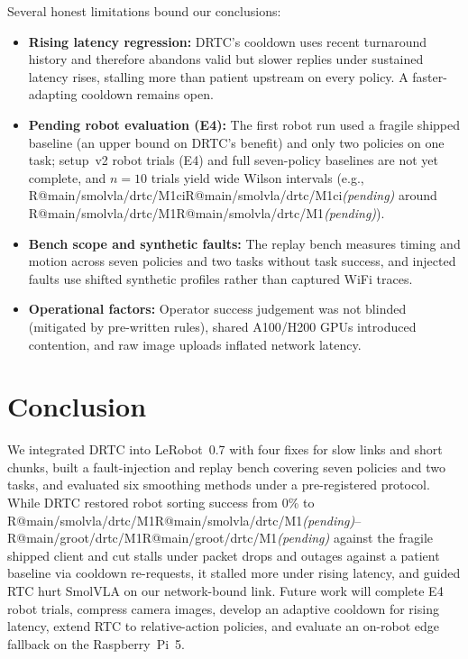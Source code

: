 \documentclass[conference]{IEEEtran}
\makeatletter
\newcommand{\R}[1]{\ifcsname R@#1\endcsname\csname R@#1\endcsname\else\textit{(pending)}\fi}
\newcommand{\drtc}{DRTC}
\newcommand{\smolvla}{SmolVLA}
\makeatother
\begin{document}
Several honest limitations bound our conclusions:
\begin{itemize}
  \item \textbf{Rising latency regression:} \drtc's cooldown uses recent turnaround history and therefore abandons valid but slower replies under sustained latency rises, stalling more than patient upstream on every policy. A faster-adapting cooldown remains open.
  \item \textbf{Pending robot evaluation (E4):} The first robot run used a fragile shipped baseline (an upper bound on \drtc's benefit) and only two policies on one task; setup~v2 robot trials (E4) and full seven-policy baselines are not yet complete, and $n=10$ trials yield wide Wilson intervals (e.g., \R{main/smolvla/drtc/M1ci} around \R{main/smolvla/drtc/M1}).
  \item \textbf{Bench scope and synthetic faults:} The replay bench measures timing and motion across seven policies and two tasks without task success, and injected faults use shifted synthetic profiles rather than captured WiFi traces.
  \item \textbf{Operational factors:} Operator success judgement was not blinded (mitigated by pre-written rules), shared A100/H200 GPUs introduced contention, and raw image uploads inflated network latency.
\end{itemize}

\section{Conclusion}

We integrated \drtc{} into LeRobot~0.7 with four fixes for slow links and short chunks, built a fault-injection and replay bench covering seven policies and two tasks, and evaluated six smoothing methods under a pre-registered protocol. While \drtc{} restored robot sorting success from 0\% to \R{main/smolvla/drtc/M1}--\R{main/groot/drtc/M1} against the fragile shipped client and cut stalls under packet drops and outages against a patient baseline via cooldown re-requests, it stalled more under rising latency, and guided RTC hurt \smolvla{} on our network-bound link. Future work will complete E4 robot trials, compress camera images, develop an adaptive cooldown for rising latency, extend RTC to relative-action policies, and evaluate an on-robot edge fallback on the Raspberry~Pi~5.



\end{document}
